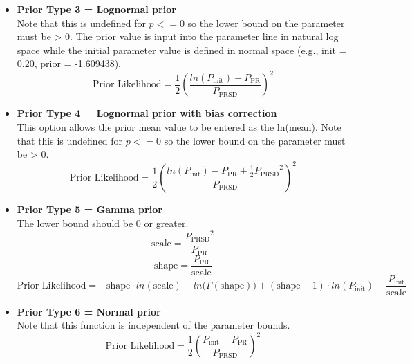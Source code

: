 \begin{itemize}
	\begin{equation}
			\text{Prior Likelihood} = & (1 - \beta_\text{PR}) \cdot ln(0.0001 + P_\text{init} - P_\text{LB}) %
			 + (1 - \alpha_\text{PR}) \cdot ln(0.0001 + P_\text{UB} - P_\text{init}) %
			 - (1 - \beta_\text{PR}) \cdot ln(0.0001 + P_\text{PR} - P_\text{LB}) %
			 - (1 - \alpha_\text{PR}) \cdot ln(0.0001 + P_\text{UB} - P_\text{PR})
	\end{equation}	

	
	\item \textbf{Prior Type 3 = Lognormal prior} \\ 
	Note that this is undefined for $p <= 0$ so the lower bound on the parameter must be > 0. The prior value is input into the parameter line in natural log space while the initial parameter value is defined in normal space (e.g., init = 0.20, prior = -1.609438).
	\begin{equation}
		\text{Prior Likelihood} = \frac{1}{2} \left(\frac{ln(P_\text{init})-P_\text{PR}}{P_\text{PRSD}}\right)^2
	\end{equation}
	
	\item \textbf{Prior Type 4 = Lognormal prior with bias correction} \\ 
	This option allows the prior mean value to be entered as the ln(mean). Note that this is undefined for $p <= 0$ so the lower bound on the parameter must be > 0.
	\begin{equation}
		\text{Prior Likelihood} = \frac{1}{2} \left(\frac{ln(P_\text{init})-P_\text{PR} + \frac{1}{2}{P_\text{PRSD}}^2}{P_\text{PRSD}}\right)^2
	\end{equation}
	
	\item \textbf{Prior Type 5 = Gamma prior} \\ 
	The lower bound should be 0 or greater.
	\begin{equation}
		\text{scale} = \frac{{P_\text{PRSD}}^2}{P_\text{PR}}
	\end{equation}
	\begin{equation}
		\text{shape} = \frac{P_\text{PR}}{\text{scale}}
	\end{equation}
	\begin{equation}
		\text{Prior Likelihood} = -\text{shape} \cdot ln(\text{scale}) - ln\big(\Gamma(\text{shape})\big) + (\text{shape} - 1) \cdot ln(P_\text{init}) - \frac{P_\text{init}}{\text{scale}}
	\end{equation}
	
	\item \textbf{Prior Type 6 = Normal prior} \\ 
	Note that this function is independent of the parameter bounds.
	\begin{equation}
		\text{Prior Likelihood} = \frac{1}{2} \left(\frac{P_\text{init} - P_\text{PR}}{P_\text{PRSD}}\right)^2
	\end{equation}
\end{itemize}






\pagebreak